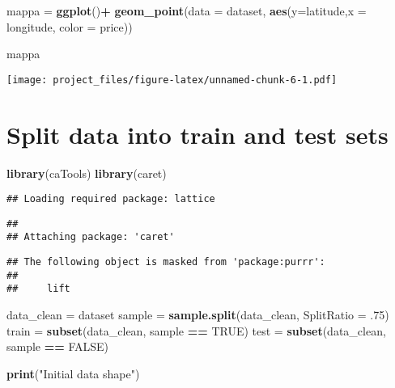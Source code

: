 \documentclass[
]{article}
\newenvironment{Shaded}{\begin{snugshade}}{\end{snugshade}}
\newcommand{\DataTypeTok}[1]{\textcolor[rgb]{0.13,0.29,0.53}{#1}}
\newcommand{\FloatTok}[1]{\textcolor[rgb]{0.00,0.00,0.81}{#1}}
\newcommand{\KeywordTok}[1]{\textcolor[rgb]{0.13,0.29,0.53}{\textbf{#1}}}
\newcommand{\NormalTok}[1]{#1}
\newcommand{\OperatorTok}[1]{\textcolor[rgb]{0.81,0.36,0.00}{\textbf{#1}}}
\newcommand{\OtherTok}[1]{\textcolor[rgb]{0.56,0.35,0.01}{#1}}
\newcommand{\StringTok}[1]{\textcolor[rgb]{0.31,0.60,0.02}{#1}}
\begin{document}
\begin{Shaded}
\begin{Highlighting}[]
\NormalTok{mappa =}\StringTok{ }\KeywordTok{ggplot}\NormalTok{()}\OperatorTok{+}\StringTok{ }\KeywordTok{geom_point}\NormalTok{(}\DataTypeTok{data =}\NormalTok{ dataset,  }\KeywordTok{aes}\NormalTok{(}\DataTypeTok{y=}\NormalTok{latitude,}\DataTypeTok{x =}\NormalTok{ longitude, }\DataTypeTok{color =}\NormalTok{ price)) }

 
\NormalTok{mappa}
\end{Highlighting}
\end{Shaded}

\texttt{[image: project\_files/figure-latex/unnamed-chunk-6-1.pdf]}

\hypertarget{split-data-into-train-and-test-sets}{%
\section{Split data into train and test
sets}\label{split-data-into-train-and-test-sets}}

\begin{Shaded}
\begin{Highlighting}[]
\KeywordTok{library}\NormalTok{(caTools)}
\KeywordTok{library}\NormalTok{(caret)}
\end{Highlighting}
\end{Shaded}

\begin{verbatim}
## Loading required package: lattice
\end{verbatim}

\begin{verbatim}
## 
## Attaching package: 'caret'
\end{verbatim}

\begin{verbatim}
## The following object is masked from 'package:purrr':
## 
##     lift
\end{verbatim}

\begin{Shaded}
\begin{Highlighting}[]
\NormalTok{data_clean =}\StringTok{ }\NormalTok{dataset}
\NormalTok{sample =}\StringTok{ }\KeywordTok{sample.split}\NormalTok{(data_clean, }\DataTypeTok{SplitRatio =} \FloatTok{.75}\NormalTok{)}
\NormalTok{train =}\StringTok{ }\KeywordTok{subset}\NormalTok{(data_clean, sample }\OperatorTok{==}\StringTok{ }\OtherTok{TRUE}\NormalTok{)}
\NormalTok{test  =}\StringTok{ }\KeywordTok{subset}\NormalTok{(data_clean, sample }\OperatorTok{==}\StringTok{ }\OtherTok{FALSE}\NormalTok{)}

\KeywordTok{print}\NormalTok{(}\StringTok{"Initial data shape"}\NormalTok{)}
\end{Highlighting}
\end{Shaded}
\end{document}
